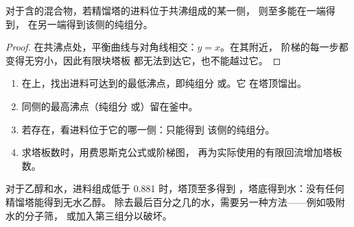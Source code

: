 \begin{proposition}[精馏塔不能越过共沸物]\label{prop:b2:liquid-vapour-diagrams:azeotrope-limit}
对于含的混合物，若精馏塔的进料位于共沸组成的某一侧，
则至多能在一端得到，
在另一端得到该侧的纯组分。
\end{proposition}

\begin{proof}
在共沸点处，平衡曲线与对角线相交：$y = x$。在其附近，
阶梯的每一步都变得无穷小，因此有限块塔板
都无法到达它，也不能越过它。
\end{proof}

\begin{method}[预测分馏结果]\label{met:b2:liquid-vapour-diagrams:predict-distillation}
\begin{enumerate}
  \item 在上，找出进料可达到的最低沸点，即纯组分
        或。它
        在塔顶馏出。
  \item 同侧的最高沸点（纯组分
        或）留在釜中。
  \item 若存在，看进料位于它的哪一侧：只能得到
        该侧的纯组分。
  \item 求塔板数时，用费恩斯克公式或阶梯图，
        再为实际使用的有限回流增加塔板数。
\end{enumerate}
\end{method}

对于乙醇和水，进料组成低于 0.881 时，塔顶至多得到
，塔底得到水：没有任何精馏塔能得到无水乙醇。
除去最后百分之几的水，需要另一种方法——例如吸附水的分子筛，
或加入第三组分以破坏。

